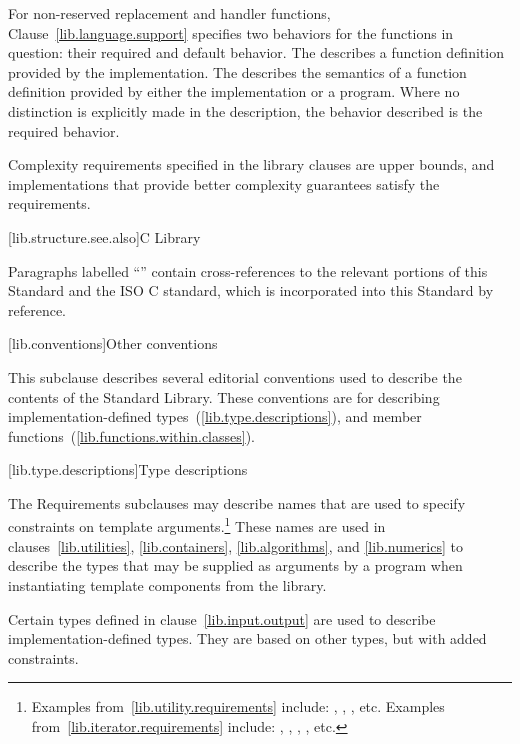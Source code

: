 \pnum
For non-reserved replacement and handler functions,
Clause~\ref{lib.language.support} specifies two behaviors for the functions in question:
their required and default behavior.
The
describes a function definition provided by the implementation.
%
The
describes the semantics of a function definition provided by
%
either the implementation or a \Cpp program.
Where no distinction is explicitly made in the description, the
behavior described is the required behavior.

\pnum
Complexity requirements specified in the library clauses are upper bounds,
and implementations that provide better complexity guarantees satisfy
the requirements.

[lib.structure.see.also]{C Library}

\pnum
Paragraphs labelled ``\xref'' contain cross-references to the relevant portions
of this Standard and the ISO C standard,
which is incorporated into this Standard by reference.

[lib.conventions]{Other conventions}
%

\pnum
This subclause describes several editorial conventions used to describe the contents
of the \Cpp Standard Library.
These conventions are for describing
implementation-defined types~(\ref{lib.type.descriptions}),
and member functions~(\ref{lib.functions.within.classes}).

[lib.type.descriptions]{Type descriptions}

\pnum
The Requirements subclauses may describe names that are used to specify
constraints on template arguments.\footnote{Examples
from~\ref{lib.utility.requirements} include:
,
,
, etc.
Examples from~\ref{lib.iterator.requirements} include:
,
,
,
, etc.}
These names are used in clauses~\ref{lib.utilities}, \ref{lib.containers},
\ref{lib.algorithms}, and \ref{lib.numerics}
to describe the types that
may be supplied as arguments by a \Cpp program when instantiating template components from
the library.

\pnum
Certain types defined in clause~\ref{lib.input.output} are used to describe implementation-defined types.
%
They are based on other types, but with added constraints.

